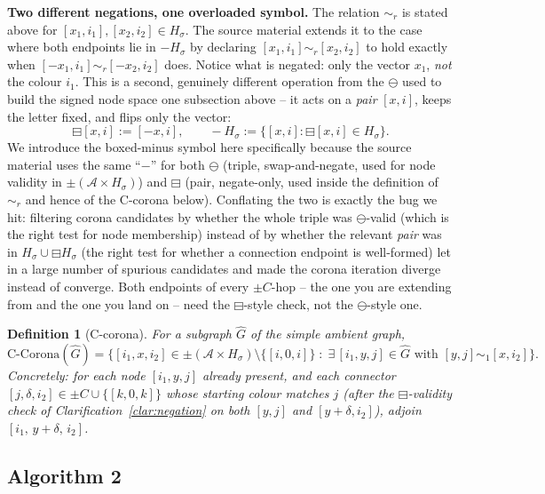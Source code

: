 \documentclass[11pt]{article}
\newtheorem{definition}{Definition}
\begin{document}
\begin{clarify}\label{clar:negation}
\textbf{Two different negations, one overloaded symbol.} The relation
$\sim_r$ is stated above for $[x_1,i_1],[x_2,i_2]\in H_\sigma$. The source
material extends it to the case where both endpoints lie in $-H_\sigma$ by
declaring $[x_1,i_1]\sim_r[x_2,i_2]$ to hold exactly when
$[-x_1,i_1]\sim_r[-x_2,i_2]$ does. Notice what is negated: only the vector
$x_1$, \emph{not} the colour $i_1$. This is a second, genuinely different
operation from the $\ominus$ used to build the signed node space one
subsection above -- it acts on a \emph{pair} $[x,i]$, keeps the letter fixed,
and flips only the vector:
$$\boxminus[x,i] := [-x,i], \qquad -H_\sigma := \{[x,i] : \boxminus[x,i]\in H_\sigma\}.$$
We introduce the boxed-minus symbol here specifically because the source
material uses the same ``$-$'' for both $\ominus$ (triple, swap-and-negate,
used for node validity in $\pm(\mathcal{A}\times H_\sigma)$) and $\boxminus$
(pair, negate-only, used inside the definition of $\sim_r$ and hence of the
C-corona below). Conflating the two is exactly the bug we hit: filtering
corona candidates by whether the whole triple was $\ominus$-valid (which is
the right test for node membership) instead of by whether the relevant
\emph{pair} was in $H_\sigma\cup\boxminus H_\sigma$ (the right test for
whether a connection endpoint is well-formed) let in a large number of
spurious candidates and made the corona iteration diverge instead of converge.
Both endpoints of every $\pm C$-hop -- the one you are extending from and the
one you land on -- need the $\boxminus$-style check, not the $\ominus$-style
one.
\end{clarify}

\begin{definition}[C-corona]
For a subgraph $\hat G$ of the simple ambient graph,
$$\mathrm{C\text{-}Corona}(\hat G) = \Big\{[i_1,x,i_2]\in\pm(\mathcal{A}\times H_\sigma)\setminus\{[i,0,i]\} \;:\; \exists\,[i_1,y,j]\in\hat G \text{ with } [y,j]\sim_1[x,i_2]\Big\}.$$
Concretely: for each node $[i_1,y,j]$ already present, and each connector
$[j,\delta,i_2]\in\pm C\cup\{[k,0,k]\}$ whose starting colour matches $j$
(after the $\boxminus$-validity check of Clarification~\ref{clar:negation} on
both $[y,j]$ and $[y+\delta,i_2]$), adjoin $[i_1,\,y+\delta,\,i_2]$.
\end{definition}

\subsection{Algorithm 2}
\end{document}

